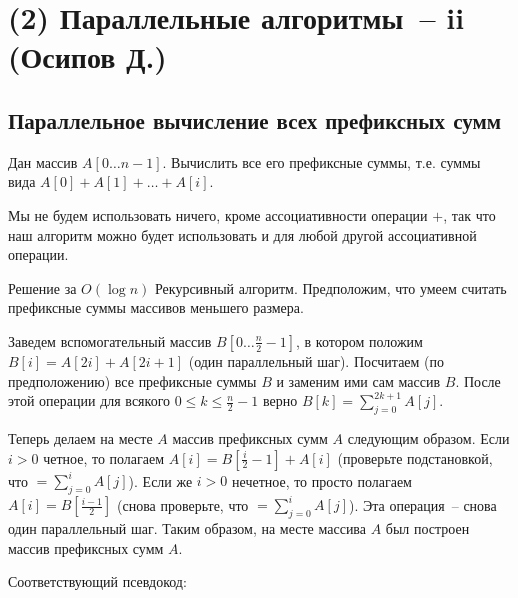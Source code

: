 \section{(2) Параллельные алгоритмы~-- ii (Осипов Д.)}
\subsection{Параллельное вычисление всех префиксных сумм}\label{parallel_sums}
\begin{problem*}
	Дан массив $A[0\ldots n-1]$. Вычислить все его префиксные суммы, т.е. суммы вида $A[0]+A[1]+\ldots+A[i]$.
\end{problem*}

Мы не будем использовать ничего, кроме ассоциативности операции $+$, так что наш алгоритм можно будет использовать
и для любой другой ассоциативной операции.

\begin{algodescription}{Решение за $O(\log n)$} Рекурсивный алгоритм. Предположим, что умеем считать префиксные суммы массивов меньшего размера.

Заведем вспомогательный массив $B[0\ldots \frac{n}{2}-1]$, в котором положим $B[i]=A[2i]+A[2i+1]$ (один параллельный шаг). Посчитаем (по предположению) все префиксные суммы $B$ и заменим ими сам массив $B$. После этой операции для всякого $0 \leq k \leq \frac{n}{2}-1$ верно $B[k] = \sum_{j=0}^{2k+1} A[j]$.

Теперь делаем на месте $A$ массив префиксных сумм $A$ следующим образом. Если $i > 0$ четное, то полагаем $A[i] = B[\frac{i}{2}-1] + A[i]$ (проверьте подстановкой, что $=\sum_{j=0}^{i}A[j]$). Если же $i > 0$ нечетное, то просто полагаем $A[i] = B[\frac{i-1}{2}]$ (снова проверьте, что $=\sum_{j=0}^{i}A[j]$). Эта операция~-- снова один параллельный шаг. Таким образом, на месте массива $A$ был построен массив префиксных сумм $A$.
\end{algodescription}

Соответствующий псевдокод:

\begin{algorithm}[H]
	\DontPrintSemicolon
\end{algorithm}

